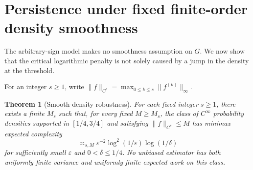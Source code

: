 \documentclass[11pt,a4paper]{article}
\newtheorem{theorem}{Theorem}
\theoremstyle{definition}
\begin{document}
\section{Persistence under fixed finite-order density smoothness}
\label{sec:smooth}
The arbitrary-sign model makes no smoothness assumption on $G$. We now
show that the critical logarithmic penalty is not solely caused by a
jump in the density at the threshold.

For an integer $s\ge1$, write
$\|f\|_{C^s}=\max_{0\le k\le s}\|f^{(k)}\|_\infty$.

\begin{theorem}[Smooth-density robustness]\label{thm:smooth}
For each fixed integer $s\ge1$, there exists a finite $M_s$ such that,
for every fixed $M\ge M_s$, the class of $C^\infty$ probability densities
supported in $[1/4,3/4]$ and satisfying $\|f\|_{C^s}\le M$ has minimax
expected complexity
\[
 \asymp_{s,M}\varepsilon^{-2}\log^2(1/\varepsilon)\log(1/\delta)
\]
for sufficiently small $\varepsilon$ and $0<\delta\le1/4$.
No unbiased estimator has both uniformly finite variance and uniformly
finite expected work on this class.
\end{theorem}
\end{document}
